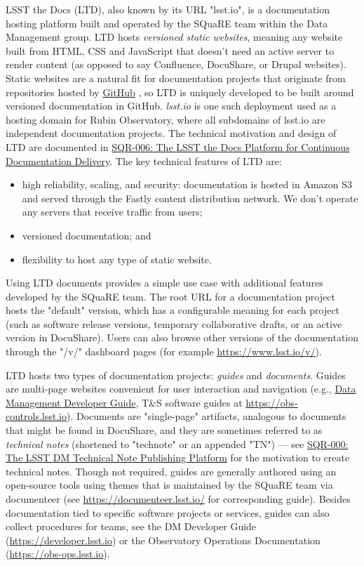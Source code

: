 LSST the Docs (LTD), also known by its URL "lsst.io", is a documentation hosting platform built and operated by the SQuaRE team within the Data Management group.
LTD hosts \emph{versioned static websites}, meaning any website built from HTML, CSS and JavaScript that doesn't need an active server to render content (as opposed to say Confluence, DocuShare, or Drupal websites).
Static websites are a natural fit for documentation projects that originate from repositories hosted by \href{https://www.github.com}{GitHub} \citep{GitHub-cite}, so LTD is uniquely developed to be built around versioned documentation in GitHub.
\emph{lsst.io} is one such deployment used as a hosting domain for Rubin Observatory, where all subdomains of lsst.io are independent documentation projects.
The technical motivation and design of LTD are documented in \href{https://sqr-006.lsst.io}{SQR-006: The LSST the Docs Platform for Continuous Documentation Delivery}. 
The key technical features of LTD are:

\begin{itemize}
	\item high reliability, scaling, and security: documentation is hosted in Amazon S3 and served through the Fastly content distribution network.
	We don't operate any servers that receive traffic from users;
	\item versioned documentation; and
	\item flexibility to host any type of static website.
\end{itemize}

Using LTD documents provides a simple use case with additional features developed by the SQuaRE team.
The root URL for a documentation project hosts the "default" version, which has a configurable meaning for each project (such as software release versions, temporary collaborative drafts, or an active version in DocuShare).
Users can also browse other versions of the documentation through the "/v/" dashboard pages (for example \url{https://www.lsst.io/v/}).

LTD hosts two types of documentation projects: \emph{guides} and \emph{documents}.
Guides are multi-page websites convenient for user interaction and navigation (e.g., \href{developer.lsst.io}{Data Management Developer Guide}, T\&S software guides at \url{https://obs-controls.lsst.io}).
Documents are "single-page" artifacts, analogous to documents that might be found in DocuShare, and they are sometimes referred to as \emph{technical notes} (shortened to "technote" or an appended "TN") --- see \href{https://sqr-000.lsst.io}{SQR-000: The LSST DM Technical Note Publishing Platform} for the motivation to create technical notes. 
Though not required, guides are generally authored using an open-source tools using themes that is maintained by the SQuaRE team via documenteer \cite{documenteer-cite} (see \url{https://documenteer.lsst.io/} for corresponding guide).
Besides documentation tied to specific software projects or services, guides can also collect procedures for teams, see the DM Developer Guide (\url{https://developer.lsst.io}) or the Observatory Operations Documentation (\url{https://obs-ops.lsst.io}).

